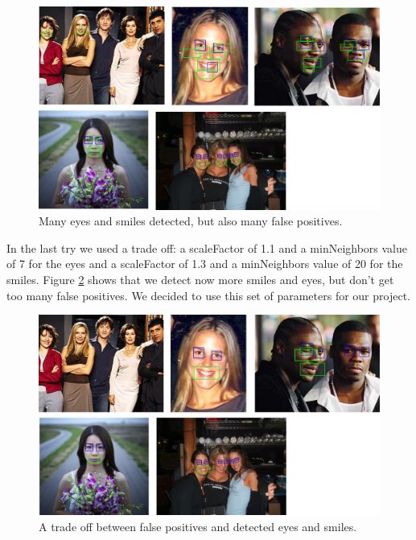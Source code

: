 \documentclass[11pt, a4paper, twocolumn]{article}
\begin{document}
\begin{figure}[H]
 \includegraphics[width=1.0\columnwidth]{images/02_manyFalsePositives_manyDetected.png}
 \centering
 \setlength{\abovecaptionskip}{1pt}
 \caption{Many eyes and smiles detected, but also many false positives.}
 \label{fig:01_manyFalsePositives}
\end{figure}
%
In the last try we used a trade off: a scaleFactor of 1.1 and a minNeighbors value of 7 for the eyes and a scaleFactor of 1.3 and a minNeighbors value of 20 for the smiles. Figure \ref{fig:03_tradeof} shows that we detect now more smiles and eyes, but don't get too many false positives. We decided to use this set of parameters for our project.
\begin{figure}[H]
 \includegraphics[width=1.0\columnwidth]{images/03_tradeof.png}
 \centering
 \setlength{\abovecaptionskip}{1pt}
 \caption{A trade off between false positives and detected eyes and smiles.}
 \label{fig:03_tradeof}
\end{figure}
\end{document}
